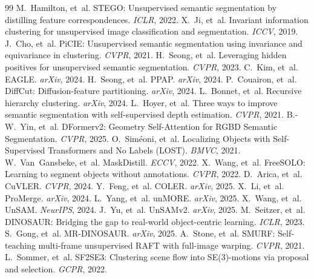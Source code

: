 \documentclass[10pt,twocolumn,letterpaper]{article}
\begin{document}
\begin{thebibliography}{99}
 M.~Hamilton, et~al. STEGO: Unsupervised semantic segmentation by distilling feature correspondences. \emph{ICLR}, 2022.
 X.~Ji, et~al. Invariant information clustering for unsupervised image classification and segmentation. \emph{ICCV}, 2019.
 J.~Cho, et~al. PiCIE: Unsupervised semantic segmentation using invariance and equivariance in clustering. \emph{CVPR}, 2021.
 H.~Seong, et~al. Leveraging hidden positives for unsupervised semantic segmentation. \emph{CVPR}, 2023.
 C.~Kim, et~al. EAGLE. \emph{arXiv}, 2024.
 H.~Seong, et~al. PPAP. \emph{arXiv}, 2024.
 P.~Couairon, et~al. DiffCut: Diffusion-feature partitioning. \emph{arXiv}, 2024.
 L.~Bonnet, et~al. Recursive hierarchy clustering. \emph{arXiv}, 2024.
 L.~Hoyer, et~al. Three ways to improve semantic segmentation with self-supervised depth estimation. \emph{CVPR}, 2021.
 B.-W.~Yin, et~al. DFormerv2: Geometry Self-Attention for RGBD Semantic Segmentation. \emph{CVPR}, 2025.
 O.~Sim\'eoni, et~al. Localizing Objects with Self-Supervised Transformers and No Labels (LOST). \emph{BMVC}, 2021.
 W.~Van~Gansbeke, et~al. MaskDistill. \emph{ECCV}, 2022.
 X.~Wang, et~al. FreeSOLO: Learning to segment objects without annotations. \emph{CVPR}, 2022.
 D.~Arica, et~al. CuVLER. \emph{CVPR}, 2024.
 Y.~Feng, et~al. COLER. \emph{arXiv}, 2025.
 X.~Li, et~al. ProMerge. \emph{arXiv}, 2024.
 L.~Yang, et~al. unMORE. \emph{arXiv}, 2025.
 X.~Wang, et~al. UnSAM. \emph{NeurIPS}, 2024.
 J.~Yu, et~al. UnSAMv2. \emph{arXiv}, 2025.
 M.~Seitzer, et~al. DINOSAUR: Bridging the gap to real-world object-centric learning. \emph{ICLR}, 2023.
 S.~Gong, et~al. MR-DINOSAUR. \emph{arXiv}, 2025.
 A.~Stone, et~al. SMURF: Self-teaching multi-frame unsupervised RAFT with full-image warping. \emph{CVPR}, 2021.
 L.~Sommer, et~al. SF2SE3: Clustering scene flow into SE(3)-motions via proposal and selection. \emph{GCPR}, 2022.
\end{thebibliography}
\end{document}
